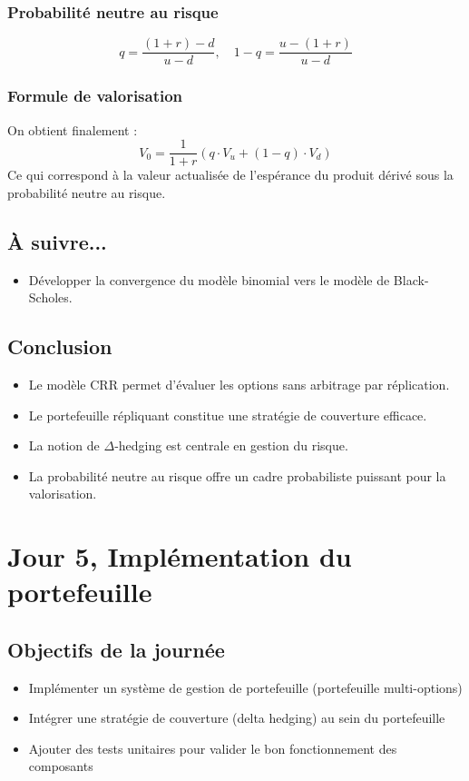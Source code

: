 \documentclass[a4paper,11pt]{article}
\begin{document}
\subsubsection*{Probabilité neutre au risque}
\[
q = \frac{(1 + r) - d}{u - d}, \quad 1 - q = \frac{u - (1 + r)}{u - d}
\]

\subsubsection*{Formule de valorisation}
On obtient finalement :
\[
\boxed{V_0 = \frac{1}{1 + r} \left( q \cdot V_u + (1 - q) \cdot V_d \right)}
\]
Ce qui correspond à la valeur actualisée de l'espérance du produit dérivé sous la probabilité neutre au risque.

\subsection{À suivre...}
\begin{itemize}
    \item Développer la convergence du modèle binomial vers le modèle de Black-Scholes.
\end{itemize}

\subsection{Conclusion}
\begin{itemize}
    \item Le modèle CRR permet d’évaluer les options sans arbitrage par réplication.
    \item Le portefeuille répliquant constitue une stratégie de couverture efficace.
    \item La notion de \(\Delta\)-hedging est centrale en gestion du risque.
    \item La probabilité neutre au risque offre un cadre probabiliste puissant pour la valorisation.
\end{itemize}

\newpage


\section{Jour 5, Implémentation du portefeuille}
\subsection{Objectifs de la journée}
\begin{itemize}
    \item Implémenter un système de gestion de portefeuille (portefeuille multi-options)
    \item Intégrer une stratégie de couverture (delta hedging) au sein du portefeuille
    \item Ajouter des tests unitaires pour valider le bon fonctionnement des composants
\end{itemize}
\end{document}
